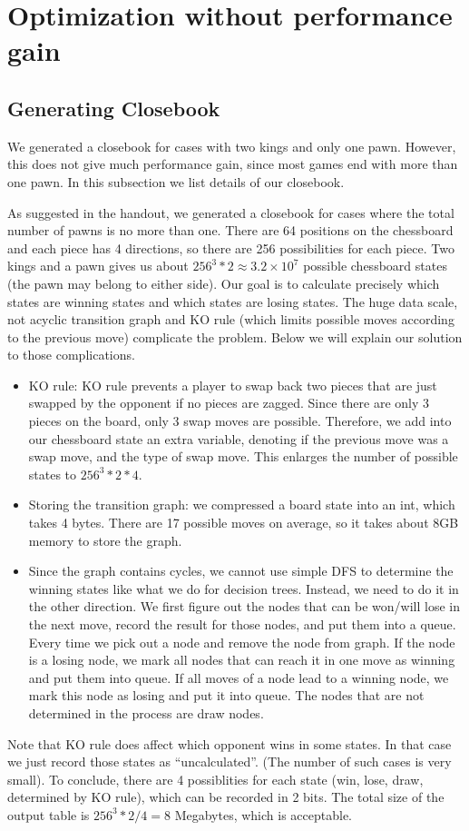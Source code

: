 \documentclass[10pt,twosidep]{article}
\begin{document}
\section{Optimization without performance gain}
\subsection{Generating Closebook}

    We generated a closebook for cases with two kings and only one pawn. However, this does not give much performance gain, since most games end with more than one pawn. In this subsection we list details of our closebook. 

	As suggested in the handout, we generated a closebook 
	for cases where the total number of pawns is no more than one. 
	There are 64 positions on the chessboard and each piece has 4 directions, 
	so there are 256 possibilities for each piece. 
	Two kings and a pawn gives us about $256^3*2\approx 3.2\times 10^7$ possible chessboard states 
	(the pawn may belong to either side).
	Our goal is to calculate precisely which states are winning states and which states are losing states.
	The huge data scale, not acyclic transition graph and KO rule 
	(which limits possible moves according to the previous move) complicate the problem.
	Below we will explain our solution to those complications. 

	\begin{itemize}
	\item KO rule: KO rule prevents a player to swap back two pieces that are just swapped by the opponent 
	if no pieces are zagged. Since there are only 3 pieces on the board, only 3 swap moves are possible. 
	Therefore, we add into our chessboard state an extra variable, denoting if the previous move was a swap move, 
	and the type of swap move. This enlarges the number of possible states to $256^3*2*4$.
	\item Storing the transition graph: we compressed a board state into an int, which takes 4 bytes. 
	There are 17 possible moves on average, so it takes about 8GB memory to store the graph. 
	\item Since the graph contains cycles, 
	we cannot use simple DFS to determine the winning states like what we do for decision trees. Instead, 
	we need to do it in the other direction. 
	We first figure out the nodes that can be won/will lose in the next move, 
	record the result for those nodes, and put them into a queue. 
	Every time we pick out a node and remove the node from graph. 
	If the node is a losing node, we mark all nodes that can reach it in one move as winning and put them into queue. 
	If all moves of a node lead to a winning node, we mark this node as losing and put it into queue. 
	The nodes that are not determined in the process are draw nodes. 
	\end{itemize}
	Note that KO rule does affect which opponent wins in some states. In that case 
	we just record those states as ``uncalculated''. (The number of such cases is very small).
	To conclude, there are 4 possiblities for each state (win, lose, draw, determined by KO rule), 
	which can be recorded in 2 bits. The total size of the output table
	is $256^3*2/4=8$ Megabytes, which is acceptable.
\end{document}
